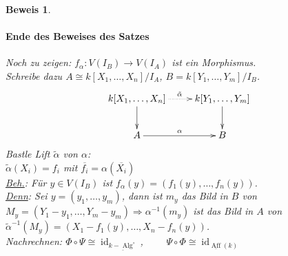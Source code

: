 \documentclass[a4paper,12pt]{report}
\theoremstyle{break}
\theoremstyle{nonumberbreak}
\theoremstyle{nonumberplain}
\newtheorem{Bew}{Beweis}
\begin{document}
\begin{Bew}
\paragraph{Ende des Beweises des Satzes}
Noch zu zeigen: $f_{\alpha}: V(I_B) \rightarrow V(I_A)$ ist ein Morphismus.\\
Schreibe dazu $A\cong k[X_1,\dots,X_n]/I_A$, $B=k[Y_1,\dots,Y_m]/I_B$.
\[
\begin{xy}
\xymatrix{
k[X_1,\dots,X_n]\ar@{.>}[r]^{\tilde{\alpha}}\ar[d]&k[Y_1,\dots,Y_m]\ar[d] \\
A\ar[r]^{\alpha}&B
}
\end{xy}
\]
Bastle Lift $\tilde{\alpha}$ von $\alpha$:\\
$\tilde{\alpha}(X_i)=f_i$ mit $\overline{f_i}=\alpha(\overline{X_i})$\\
\underline{Beh.}: Für $y\in V(I_B)$ ist $f_{\alpha}(y)=(f_1(y),\dots,f_n(y))$.\\
\underline{Denn}: Sei $y=(y_1,\dots,y_m)$, dann ist $m_y$ das Bild in $B$ von $M_y=(Y_1-y_1,\dots,Y_m-y_m)\Rightarrow \alpha^{-1}(m_y)$ ist das Bild in $A$ von $\tilde{\alpha}^{-1}(M_y)= (X_1-f_1(y),\dots,X_n-f_n(y))$.\\
Nachrechnen: $\Phi\circ\Psi\cong\operatorname{id}_{\underline{k-\operatorname{Alg}^{\circ}}}$, ~~~~$\Psi\circ\Phi\cong\operatorname{id}_{\underline{\operatorname{Aff}}(k)}$
\end{Bew}
\end{document}
